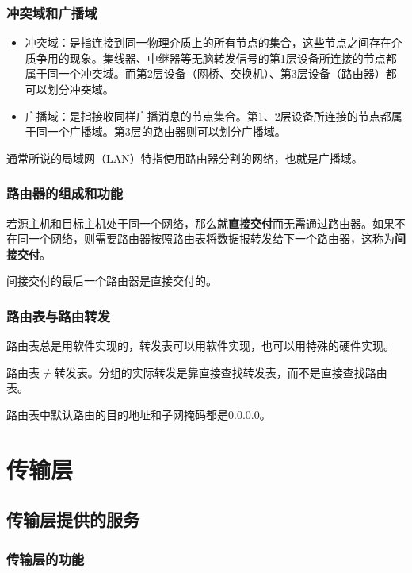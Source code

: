 \documentclass[12pt, a4paper, oneside]{ctexart}
\begin{document}
\subsubsection{冲突域和广播域}

\begin{itemize}
    \item 冲突域：是指连接到同一物理介质上的所有节点的集合，这些节点之间存在介质争用的现象。集线器、中继器等无脑转发信号的第1层设备所连接的节点都属于同一个冲突域。而第2层设备（网桥、交换机）、第3层设备（路由器）都可以划分冲突域。
    \item 广播域：是指接收同样广播消息的节点集合。第1、2层设备所连接的节点都属于同一个广播域。第3层的路由器则可以划分广播域。
\end{itemize}
通常所说的局域网（LAN）特指使用路由器分割的网络，也就是广播域。

\subsubsection{路由器的组成和功能}

若源主机和目标主机处于同一个网络，那么就\textbf{直接交付}而无需通过路由器。如果不在同一个网络，则需要路由器按照路由表将数据报转发给下一个路由器，这称为\textbf{间接交付}。

间接交付的最后一个路由器是直接交付的。

\subsubsection{路由表与路由转发}

路由表总是用软件实现的，转发表可以用软件实现，也可以用特殊的硬件实现。

路由表$\neq$转发表。分组的实际转发是靠直接查找转发表，而不是直接查找路由表。

路由表中默认路由的目的地址和子网掩码都是0.0.0.0。

\section{传输层}

\subsection{传输层提供的服务}

\subsubsection{传输层的功能}
\end{document}
